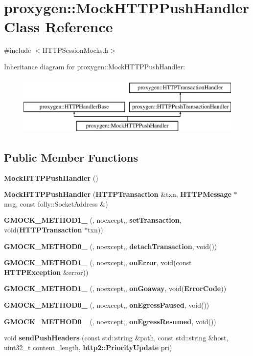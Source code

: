 \section{proxygen\+:\+:Mock\+H\+T\+T\+P\+Push\+Handler Class Reference}
\label{classproxygen_1_1MockHTTPPushHandler}


{\ttfamily \#include $<$H\+T\+T\+P\+Session\+Mocks.\+h$>$}

Inheritance diagram for proxygen\+:\+:Mock\+H\+T\+T\+P\+Push\+Handler\+:\begin{figure}[H]
\begin{center}
\leavevmode
\includegraphics[height=3.000000cm]{classproxygen_1_1MockHTTPPushHandler}
\end{center}
\end{figure}
\subsection*{Public Member Functions}
\begin{DoxyCompactItemize}
\item 
{\bf Mock\+H\+T\+T\+P\+Push\+Handler} ()
\item 
{\bf Mock\+H\+T\+T\+P\+Push\+Handler} ({\bf H\+T\+T\+P\+Transaction} \&txn, {\bf H\+T\+T\+P\+Message} $\ast$msg, const folly\+::\+Socket\+Address \&)
\item 
{\bf G\+M\+O\+C\+K\+\_\+\+M\+E\+T\+H\+O\+D1\+\_\+} (, noexcept,, {\bf set\+Transaction}, void({\bf H\+T\+T\+P\+Transaction} $\ast$txn))
\item 
{\bf G\+M\+O\+C\+K\+\_\+\+M\+E\+T\+H\+O\+D0\+\_\+} (, noexcept,, {\bf detach\+Transaction}, void())
\item 
{\bf G\+M\+O\+C\+K\+\_\+\+M\+E\+T\+H\+O\+D1\+\_\+} (, noexcept,, {\bf on\+Error}, void(const {\bf H\+T\+T\+P\+Exception} \&error))
\item 
{\bf G\+M\+O\+C\+K\+\_\+\+M\+E\+T\+H\+O\+D1\+\_\+} (, noexcept,, {\bf on\+Goaway}, void({\bf Error\+Code}))
\item 
{\bf G\+M\+O\+C\+K\+\_\+\+M\+E\+T\+H\+O\+D0\+\_\+} (, noexcept,, {\bf on\+Egress\+Paused}, void())
\item 
{\bf G\+M\+O\+C\+K\+\_\+\+M\+E\+T\+H\+O\+D0\+\_\+} (, noexcept,, {\bf on\+Egress\+Resumed}, void())
\item 
void {\bf send\+Push\+Headers} (const std\+::string \&path, const std\+::string \&host, uint32\+\_\+t content\+\_\+length, {\bf http2\+::\+Priority\+Update} pri)
\end{DoxyCompactItemize}
